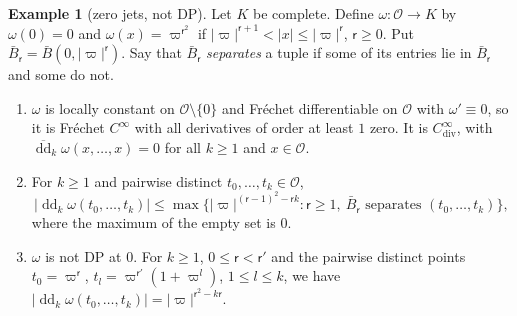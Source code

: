 \documentclass[11pt]{amsart}
\theoremstyle{definition}
\theoremstyle{remark}
\numberwithin{equation}{section}
\newcommand{\abs}[1]{\lvert #1\rvert}
\theoremstyle{plain}
\theoremstyle{definition}
\newtheorem{example}[theorem]{Example}
\theoremstyle{plain}
\begin{document}
\begin{example}[zero jets, not DP]\label{dp:ex:zero-jets}
Let $K$ be complete. Define $\omega\colon\mathcal O\to K$ by $\omega(0)=0$ and $\omega(x)=\varpi^{\mathsf r^2}$ if $\abs\varpi^{\mathsf r+1}<\abs x\le\abs\varpi^{\mathsf r}$, $\mathsf r\ge0$. Put $\bar B_{\mathsf r}=\bar B(0,\abs\varpi^{\mathsf r})$. Say that $\bar B_{\mathsf r}$ \emph{separates} a tuple if some of its entries lie in $\bar B_{\mathsf r}$ and some do not.
\begin{enumerate}
\item $\omega$ is locally constant on $\mathcal O\setminus\{0\}$ and Fr\'echet differentiable on $\mathcal O$ with $\omega'\equiv0$, so it is Fr\'echet $C^\infty$ with all derivatives of order at least $1$ zero. It is $C^\infty_{\mathrm{div}}$, with $\overline{\operatorname{dd}}_k\omega(x,\dots,x)=0$ for all $k\ge1$ and $x\in\mathcal O$.
\item For $k\ge1$ and pairwise distinct $t_0,\dots,t_k\in\mathcal O$,
\begin{equation}\label{dp:sq:omega-bound}
 \abs{\operatorname{dd}_k\omega(t_0,\dots,t_k)}\le\max\bigl\{\abs\varpi^{(\mathsf r-1)^2-\mathsf rk}:\mathsf r\ge1,\ \bar B_{\mathsf r}\text{ separates }(t_0,\dots,t_k)\bigr\},
\end{equation}
where the maximum of the empty set is $0$.
\item $\omega$ is not DP at $0$. For $k\ge1$, $0\le\mathsf r<\mathsf r'$ and the pairwise distinct points $t_0=\varpi^{\mathsf r}$, $t_l=\varpi^{\mathsf r'}(1+\varpi^l)$, $1\le l\le k$, we have $\abs{\operatorname{dd}_k\omega(t_0,\dots,t_k)}=\abs\varpi^{\mathsf r^2-k\mathsf r}$.
\end{enumerate}
\end{example}
\end{document}
